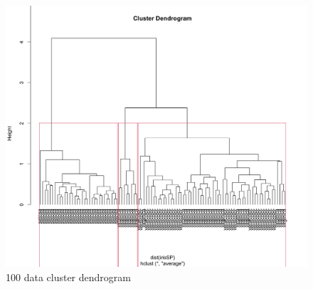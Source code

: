 \documentclass{article}
\begin{document}
\begin{figure}[H]
    \caption{100 data cluster dendrogram}
    \includegraphics[width=1\textwidth]{Fig7}
\end{figure}
\end{document}
